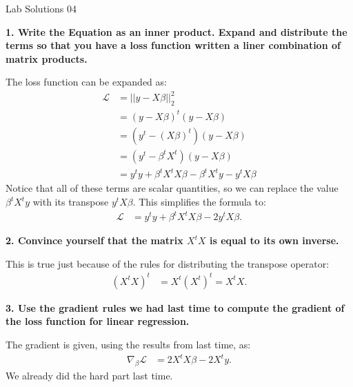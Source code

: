 \documentclass[12pt,hidelinks]{article}
\numberwithin{equation}{section}
\begin{document}
{\LARGE Lab Solutions 04}

\vspace*{12pt}

\textbf{1. Write the Equation as an inner product. Expand and distribute
the terms so that you have a loss function written a liner combination of
matrix products.}

\vspace*{12pt}

The loss function can be expanded as:
\begin{align}
\mathcal{L} &= || y - X \beta ||_2^2 \\
&= (y - X \beta)^t (y - X \beta) \\
&= (y^t - (X \beta)^t) (y - X \beta) \\
&= (y^t - \beta^t X^t) (y - X \beta) \\
&= y^t y + \beta^t X^t X \beta - \beta^t X^t y - y^t X \beta
\end{align}
Notice that all of these terms are scalar quantities, so we can replace the
value $\beta^t X^t y$ with its transpose $y^t X \beta$. This simplifies the
formula to:
\begin{align}
\mathcal{L} &= y^t y + \beta^t X^t X \beta - 2 y^t X \beta.
\end{align}

\vspace*{12pt}

\textbf{2. Convince yourself that the matrix $X^t X$ is equal to its own inverse.}

\vspace*{12pt}

This is true just because of the rules for distributing the transpose operator:
\begin{align}
(X^t X)^t &= X^t (X^t)^t = X^t X.
\end{align}

\vspace*{12pt}

\textbf{3. Use the gradient rules we had last time to compute the gradient of the
loss function for linear regression.}

\vspace*{12pt}

The gradient is given, using the results from last time, as:
\begin{align}
\nabla_\beta \mathcal{L} &= 2 X^t X \beta - 2 X^t y.
\end{align}
We already did the hard part last time.

\vspace*{12pt}
\end{document}

